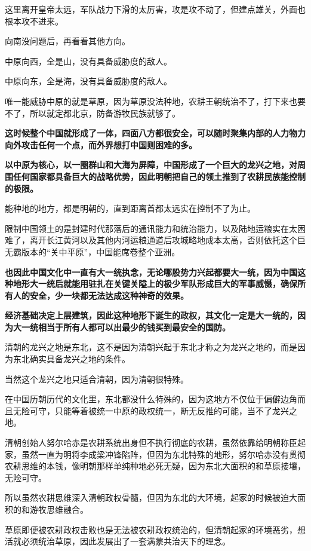 \documentclass[UTF8, 11pt, oneside]{ctexart}
\newcommand{\zd}[1]{\textbf{\textcolor[RGB]{123,12,0}{#1}}} %
\begin{document}
这里离开皇帝太远，军队战力下滑的太厉害，攻是攻不动了，但建点雄关，外面也根本攻不进来。

向南没问题后，再看看其他方向。

中原向西，全是山，没有具备威胁度的敌人。

中原向东，全是海，没有具备威胁度的敌人。

唯一能威胁中原的就是草原，因为草原没法种地，农耕王朝统治不了，打下来也要不了，所以就定都北京，防备游牧民族就够了。

\zd{这时候整个中国就形成了一体，四面八方都很安全，可以随时聚集内部的人力物力向外攻击任何一个点，而外界想打中国则困难的多。}

\zd{以中原为核心，以一圈群山和大海为屏障，中国形成了一个巨大的龙兴之地，对周围任何国家都具备巨大的战略优势，因此明朝把自己的领土推到了农耕民族能控制的极限。}

能种地的地方，都是明朝的，直到距离首都太远实在控制不了为止。

限制中国领土的是封建时代那落后的通讯能力和统治能力，以及陆地运粮实在太困难了，离开长江黄河以及其他内河运粮通道后攻城略地成本太高，否则依托这个巨无霸版本的“关中平原”，中国能席卷整个亚洲。

\zd{也因此中国文化中一直有大一统执念，无论哪股势力兴起都要大一统，因为中国这种地形大一统后就能用驻扎在关键关隘上的极少军队形成巨大的军事威慑，确保所有人的安全，少一块都无法达成这种神奇的效果。}

\zd{经济基础决定上层建筑，因此这种地形下诞生的政权，其文化一定是大一统的，因为大一统相当于所有人都可以出最少的钱买到最安全的国防。}

清朝的龙兴之地是东北，这不是因为清朝兴起于东北才称之为龙兴之地的，而是因为东北确实具备龙兴之地的条件。

当然这个龙兴之地只适合清朝，因为清朝很特殊。

在中国历朝历代的文化里，东北都没什么特殊的，因为这地方不仅位于偏僻边角而且无险可守，只能等着被统一中原的政权统一，断无反推的可能，当不了龙兴之地。

清朝创始人努尔哈赤是农耕系统出身但不执行彻底的农耕，虽然依靠给明朝称臣起家，虽然一直为明将李成梁冲锋陷阵，但因为东北特殊的地形，努尔哈赤没有贯彻农耕思维的本钱，像明朝那样单纯种地必死无疑，因为东北大面积的和草原接壤，无险可守。

所以虽然农耕思维深入清朝政权骨髓，但因为东北的大环境，起家的时候被迫大面积的和游牧思维融合。

草原即便被农耕政权击败也是无法被农耕政权统治的，但清朝起家的环境恶劣，想活就必须统治草原，因此发展出了一套满蒙共治天下的理念。
\end{document}
